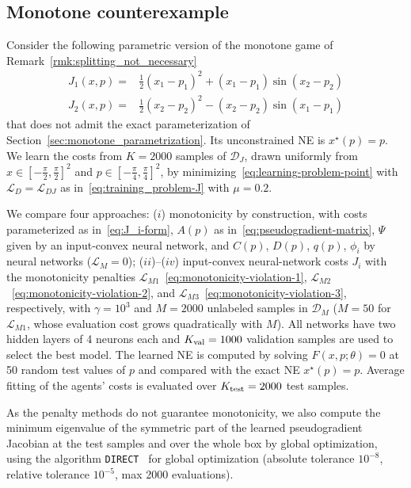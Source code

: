 \documentclass[11pt, a4paper]{article}
\newcommand{\DD}{\mathcal{D}}
\newcommand{\LL}{\mathcal{L}}
\theoremstyle{remark}
\theoremstyle{plain}
\begin{document}
\subsection{Monotone counterexample}
Consider the following parametric version of the monotone game of Remark~\ref{rmk:splitting_not_necessary}
\begin{equation}
\begin{aligned}
J_1(x,p)=&\tfrac12(x_1-p_1)^2+(x_1-p_1)\sin (x_2-p_2)\\
J_2(x,p)=&\tfrac12(x_2-p_2)^2-(x_2-p_2)\sin (x_1-p_1)
\end{aligned}
\label{eq:parametric-counterexample}
\end{equation}
that does not admit the exact parameterization of Section~\ref{sec:monotone_parametrization}. Its unconstrained NE is $x^\star(p)=p$. We learn the costs from $K=2000$ samples of $\DD_J$, drawn uniformly from $x\in[-\tfrac{\pi}{2},\tfrac{\pi}{2}]^2$ and $p\in[-\tfrac{\pi}{4},\tfrac{\pi}{4}]^2$, by minimizing~\eqref{eq:learning-problem-point} with $\LL_D=\LL_{DJ}$ as in~\eqref{eq:training_problem-J} with $\mu=0.2$. 

We compare four approaches: ($i$) monotonicity by construction, with costs parameterized as in~\eqref{eq:J_i-form}, $A(p)$ as in~\eqref{eq:pseudogradient-matrix}, $\Psi$ given by an input-convex neural network, and $C(p)$, $D(p)$, $q(p)$, $\phi_i$ by neural networks ($\LL_M=0$); ($ii$)--($iv$) input-convex neural-network costs $J_i$ with the monotonicity penalties $\LL_{M1}$~\eqref{eq:monotonicity-violation-1}, $\LL_{M2}$~\eqref{eq:monotonicity-violation-2}, and $\LL_{M3}$~\eqref{eq:monotonicity-violation-3}, respectively, with $\gamma=10^3$ and $M=2000$ unlabeled samples in $\DD_M$ ($M=50$ for $\LL_{M1}$, whose evaluation cost grows quadratically with $M$). All networks have two hidden layers of 4 neurons each and $K_{\rm val}=1000$ validation samples are used to select the best model. The learned NE is computed by solving $F(x,p;\theta)=0$ at 50 random test values of $p$ and compared with the exact NE $x^\star(p)=p$. Average fitting of the agents' costs is evaluated over $K_{\rm test}=2000$ test samples. 

As the penalty methods do not guarantee monotonicity, we also compute the minimum eigenvalue of the symmetric part of the learned pseudogradient Jacobian at the test samples and over the whole box by global optimization,
using the algorithm \texttt{DIRECT}~\cite{JSW98,JM21} for global optimization (absolute tolerance $10^{-8}$, relative tolerance $10^{-5}$, max 2000 evaluations). 
\end{document}
